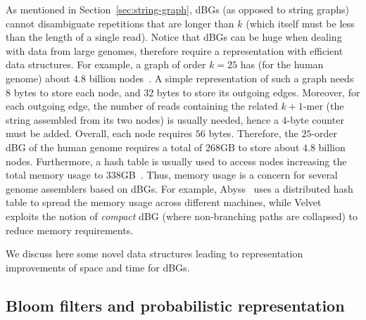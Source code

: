 \documentclass[11pt,oneside,a4paper]{article}
\begin{document}
As mentioned in Section~\ref{sec:string-graph}, dBGs (as opposed to string graphs) cannot disambiguate repetitions that are longer than $k$ (which itself must be less than the length of a single read). 
%
Notice that dBGs can be huge when dealing with data from large genomes, therefore require a representation with efficient data structures.
For example, a graph of order $k=25$ has (for the human genome) about $4.8$ billion nodes~\cite{Conway15022011}.
A simple representation of such a graph needs $8$ bytes to store each node, and
$32$ bytes to store its outgoing edges.
Moreover, for each outgoing edge, the number of reads containing the related $k+1$-mer (the string assembled from its two nodes) is usually needed, hence a
$4$-byte counter must be added.    
Overall, each node requires $56$ bytes.
Therefore, the $25$-order dBG of the human genome requires a total of $268$GB to store about $4.8$ billion nodes.
Furthermore, a hash table is usually used to access nodes increasing the total memory usage to $338$GB~\cite{Conway15022011}.
%
Thus, memory usage is a concern for several genome assemblers based on dBGs.
For example, Abyss~\cite{Simpson2009} uses a distributed hash table to spread the memory usage across
different machines, while Velvet~\cite{Zerbino2008}
exploits the notion of \emph{compact} dBG (where non-branching paths are collapsed) to reduce memory requirements.

We discuss here some novel data structures leading to 
representation improvements of space and time for dBGs.

\subsection{Bloom filters and probabilistic representation}
\end{document}
